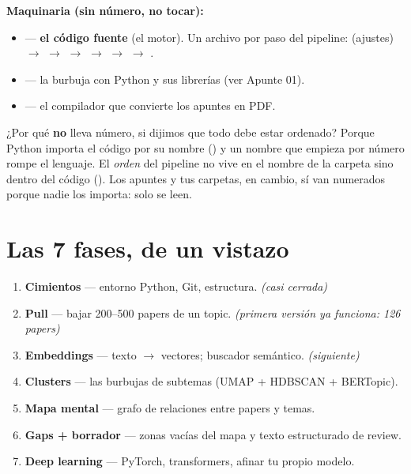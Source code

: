\documentclass[11pt,a4paper]{article}
\begin{document}
\textbf{Maquinaria (sin número, no tocar):}
\begin{itemize}
  \item {} --- \textbf{el código fuente} (el motor). Un archivo por paso del
        pipeline:  (ajustes) $\rightarrow$  $\rightarrow$
         $\rightarrow$  $\rightarrow$ 
        $\rightarrow$  $\rightarrow$ .
  \item {} --- la burbuja con Python y sus librerías (ver Apunte 01).
  \item {} --- el compilador que convierte los apuntes en PDF.
\end{itemize}

\begin{ojo}
¿Por qué  \textbf{no} lleva número, si dijimos que todo debe estar ordenado?
Porque Python importa el código por su nombre () y un nombre
que empieza por número rompe el lenguaje. El \emph{orden} del pipeline no vive en el nombre
de la carpeta sino dentro del código (). Los apuntes y tus
carpetas, en cambio, sí van numerados porque nadie los importa: solo se leen.
\end{ojo}

\section{Las 7 fases, de un vistazo}

\begin{enumerate}
  \item[\textbf{F0}] \textbf{Cimientos} --- entorno Python, Git, estructura. \emph{(casi cerrada)}
  \item[\textbf{F1}] \textbf{Pull} --- bajar 200--500 papers de un topic. \emph{(primera versión ya funciona: 126 papers)}
  \item[\textbf{F2}] \textbf{Embeddings} --- texto $\rightarrow$ vectores; buscador semántico. \emph{(siguiente)}
  \item[\textbf{F3}] \textbf{Clusters} --- las burbujas de subtemas (UMAP + HDBSCAN + BERTopic).
  \item[\textbf{F4}] \textbf{Mapa mental} --- grafo de relaciones entre papers y temas.
  \item[\textbf{F5}] \textbf{Gaps + borrador} --- zonas vacías del mapa y texto estructurado de review.
  \item[\textbf{F6}] \textbf{Deep learning} --- PyTorch, transformers, afinar tu propio modelo.
\end{enumerate}
\end{document}

